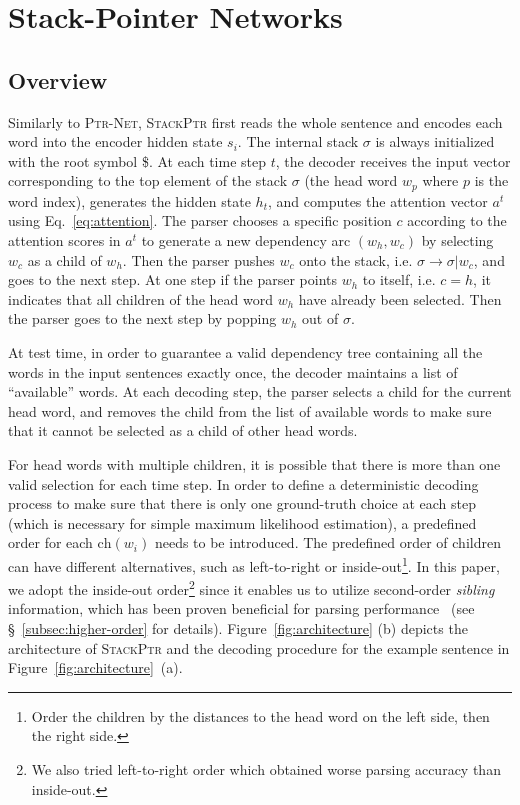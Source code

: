 \documentclass[11pt,a4paper]{article}
\begin{document}
\section{Stack-Pointer Networks}
\label{subsec:stackptr}


\subsection{Overview}
Similarly to \textsc{Ptr-Net}, \textsc{StackPtr} first reads the whole sentence and encodes each word into the encoder hidden state $s_i$. 
The internal stack $\sigma$ is always initialized with the root symbol \$. 
At each time step $t$, the decoder receives the input vector corresponding to the top element of the stack $\sigma$ (the head word $w_p$ where $p$ is the word index), generates the hidden state $h_t$, and computes the attention vector $a^t$ using Eq.~\eqref{eq:attention}. 
The parser chooses a specific position $c$ according to the attention scores in $a^t$ to generate a new dependency arc $(w_h, w_c)$ by selecting $w_c$ as a child of $w_h$. Then the parser pushes $w_c$ onto the stack, i.e. $\sigma \rightarrow \sigma|w_c$, and goes to the next step.
At one step if the parser points $w_h$ to itself, i.e. $c = h$, it indicates that all children of the head word $w_h$ have already been selected. Then the parser goes to the next step by popping $w_h$ out of $\sigma$.

At test time, in order to guarantee a valid dependency tree containing all the words in the input sentences exactly once, the decoder maintains a list of ``available'' words. At each decoding step, the parser selects a child for the current head word, and removes the child from the list of available words to make sure that it cannot be selected as a child of other head words.

For head words with multiple children, it is possible that there is more than one valid selection for each time step. 
In order to define a deterministic decoding process to make sure that there is only one ground-truth choice at each step (which is necessary for simple maximum likelihood estimation), a predefined order for each $\mathrm{ch}(w_i)$ needs to be introduced. 
The predefined order of children can have different alternatives, such as left-to-right or inside-out\footnote{Order the children by the distances to the head word on the left side, then the right side.}. 
In this paper, we adopt the inside-out order\footnote{We also tried left-to-right order which obtained worse parsing accuracy than inside-out.} since it enables us to utilize second-order \emph{sibling} information, which has been proven beneficial for parsing performance~\citep{mcdonald2006online,Koo:2010} (see \S~\ref{subsec:higher-order} for details). Figure~\ref{fig:architecture} (b) depicts the architecture of \textsc{StackPtr} and the decoding procedure for the example sentence in Figure~\ref{fig:architecture}~(a).
\end{document}
